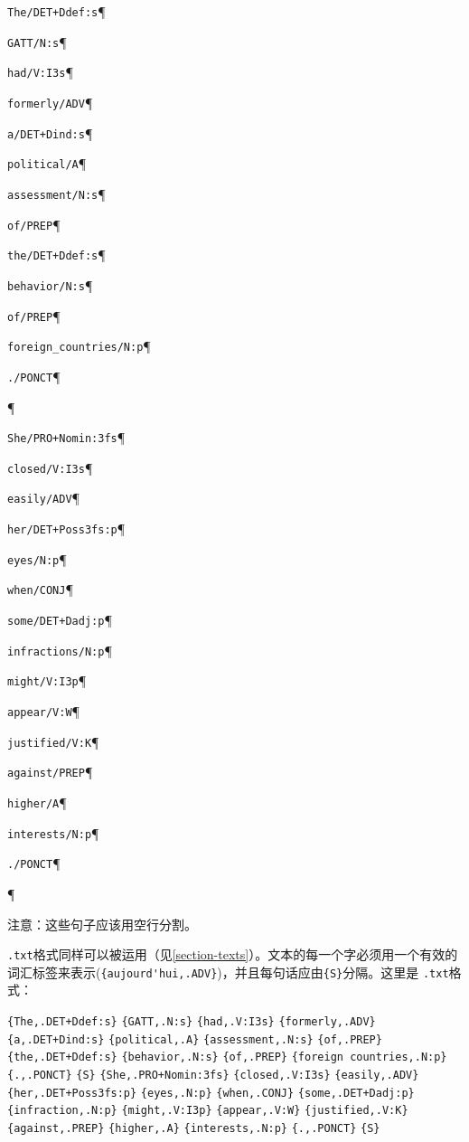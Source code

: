 \bigskip
\verb$The/DET+Ddef:s$\P

\verb+GATT/N:s+\P

\verb+had/V:I3s+\P

\verb+formerly/ADV+\P

\verb$a/DET+Dind:s$\P

\verb+political/A+\P

\verb+assessment/N:s+\P

\verb+of/PREP+\P

\verb$the/DET+Ddef:s$\P

\verb+behavior/N:s+\P

\verb+of/PREP+\P

\verb+foreign_countries/N:p+\P

\verb+./PONCT+\P

\P

\verb$She/PRO+Nomin:3fs$\P

\verb+closed/V:I3s+\P

\verb+easily/ADV+\P

\verb$her/DET+Poss3fs:p$\P

\verb+eyes/N:p+\P

\verb+when/CONJ+\P

\verb$some/DET+Dadj:p$\P

\verb+infractions/N:p+\P

\verb+might/V:I3p+\P

\verb+appear/V:W+\P

\verb+justified/V:K+\P

\verb+against/PREP+\P

\verb+higher/A+\P

\verb+interests/N:p+\P

\verb+./PONCT+\P

\P

\bigskip
\noindent
注意：这些句子应该用空行分割。


\bigskip
\verb+.txt+格式同样可以被运用（见\ref{section-texts}）。文本的每一个字必须用一个有效的词汇标签来表示(\verb+{aujourd'hui,.ADV}+)，并且每句话应由\verb+{S}+分隔。这里是 \verb+.txt+格式：

\bigskip
\verb${The,.DET+Ddef:s}$ \verb${GATT,.N:s}$ \verb${had,.V:I3s}$ \verb${formerly,.ADV}$\\ 
\verb${a,.DET+Dind:s}$ \verb${political,.A}$ \verb${assessment,.N:s}$ \verb${of,.PREP}$\\ 
\verb${the,.DET+Ddef:s}$ \verb${behavior,.N:s}$ \verb${of,.PREP}$ \verb${foreign countries,.N:p}$\\ 
\verb${.,.PONCT}$ \verb${S}$ \verb${She,.PRO+Nomin:3fs}$ \verb${closed,.V:I3s}$ \verb${easily,.ADV}$\\
\verb${her,.DET+Poss3fs:p}$ \verb${eyes,.N:p}$ \verb${when,.CONJ}$ \verb${some,.DET+Dadj:p}$\\
\verb${infraction,.N:p}$ \verb${might,.V:I3p}$ \verb${appear,.V:W}$ \verb${justified,.V:K}$\\
\verb${against,.PREP}$ \verb${higher,.A}$ \verb${interests,.N:p}$ \verb${.,.PONCT}$ \verb${S}$

